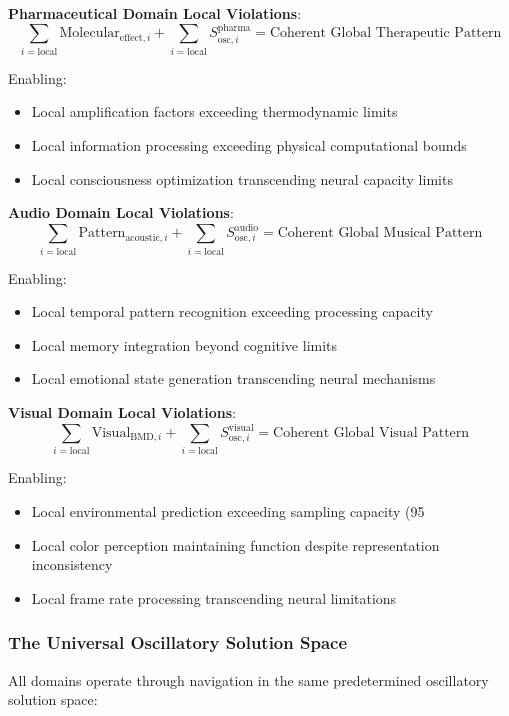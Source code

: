 \documentclass[11pt,a4paper]{article}
\theoremstyle{remark}
\begin{document}
\textbf{Pharmaceutical Domain Local Violations}:
$$\sum_{i=\text{local}} \text{Molecular}_{\text{effect},i} + \sum_{i=\text{local}} S_{\text{osc},i}^{\text{pharma}} = \text{Coherent Global Therapeutic Pattern}$$

Enabling:
\begin{itemize}
\item Local amplification factors exceeding thermodynamic limits
\item Local information processing exceeding physical computational bounds
\item Local consciousness optimization transcending neural capacity limits
\end{itemize}

\textbf{Audio Domain Local Violations}:
$$\sum_{i=\text{local}} \text{Pattern}_{\text{acoustic},i} + \sum_{i=\text{local}} S_{\text{osc},i}^{\text{audio}} = \text{Coherent Global Musical Pattern}$$

Enabling:
\begin{itemize}
\item Local temporal pattern recognition exceeding processing capacity
\item Local memory integration beyond cognitive limits  
\item Local emotional state generation transcending neural mechanisms
\end{itemize}

\textbf{Visual Domain Local Violations}:
$$\sum_{i=\text{local}} \text{Visual}_{\text{BMD},i} + \sum_{i=\text{local}} S_{\text{osc},i}^{\text{visual}} = \text{Coherent Global Visual Pattern}$$

Enabling:
\begin{itemize}
\item Local environmental prediction exceeding sampling capacity (95%
\item Local color perception maintaining function despite representation inconsistency
\item Local frame rate processing transcending neural limitations
\end{itemize}

\subsubsection{The Universal Oscillatory Solution Space}

All domains operate through navigation in the same predetermined oscillatory solution space:
\end{document}
